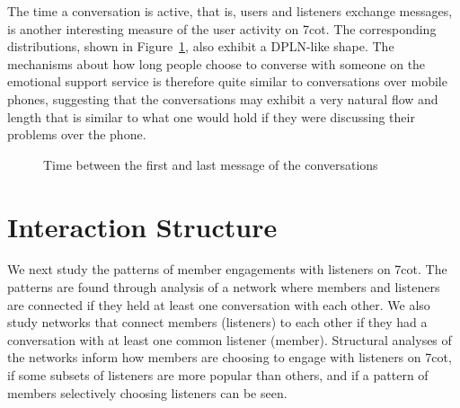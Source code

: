 The time a conversation is active, 
that is, users and listeners exchange messages, is another interesting
measure of the user activity on 7cot. The corresponding distributions,
shown in Figure~\ref{time-msg}, also exhibit a DPLN-like shape. 
The mechanisms about how long
people choose to converse with someone on the emotional support service is therefore quite similar 
to conversations over mobile phones, suggesting that the conversations may exhibit a very natural 
flow and length that is similar to what one would hold if they were discussing their problems over the phone.
\begin{figure}[htb]
\centering
{}
\caption{Time between the first and last message of the conversations}
\label{time-msg}
\end{figure}



\section{Interaction Structure}
We next study the patterns of member engagements with listeners on 7cot. 
The patterns are found through analysis of a network where members and listeners
are connected if they held at least one conversation with each other. 
We also study networks that connect members (listeners) 
to each other if they had a conversation with at least one common listener
(member).  Structural analyses of the networks inform how members are 
choosing to engage with listeners on 7cot, if some subsets of listeners
are more popular than others, and if a pattern of members selectively 
choosing listeners can be seen.

